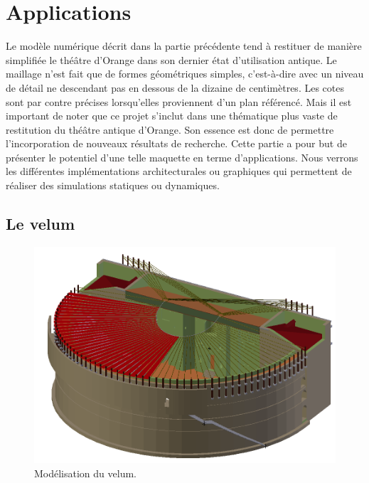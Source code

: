 		
		
		
		
		
		
		
		
		
\chapter{Applications}
	\minitoc
	\newpage

Le modèle numérique décrit dans la partie précédente tend à restituer de manière simplifiée le théâtre d'Orange dans son dernier état d'utilisation antique. Le maillage n'est fait que de formes géométriques simples, c'est-à-dire avec un niveau de détail ne descendant pas en dessous de la dizaine de centimètres. Les cotes sont par contre précises lorsqu'elles proviennent d'un plan référencé. Mais il est important de noter que ce projet s'inclut dans une thématique plus vaste de restitution du théâtre antique d'Orange. Son essence est donc de permettre l'incorporation de nouveaux résultats de recherche. Cette partie a pour but de présenter le potentiel d'une telle maquette en terme d'applications. Nous verrons les différentes implémentations architecturales ou graphiques qui permettent de réaliser des simulations statiques ou dynamiques.

\section{Le \gls{velum}} \label{sect_velum}

\begin{figure}[!h]
	\centering
	\includegraphics[width=\textwidth]{images/modVelum}
	\caption{Modélisation du \gls{velum}.} 
	\label{modVelum} 
\end{figure}

